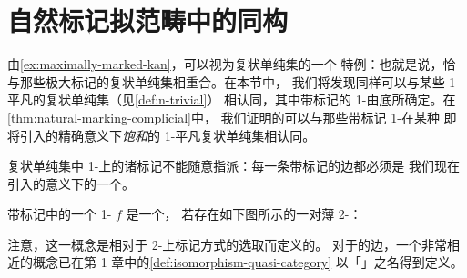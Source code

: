 
\section{自然标记拟范畴中的同构}\label{sec:isomorphisms-naturally-marked-quasi-categories}

由\cref{ex:maximally-marked-kan}，\trKanComplex{}可以视为复状单纯集的一个
特例：也就是说，\trKanComplex{}恰与那些极大标记的复状单纯集相重合。在本节中，
我们将发现\trQuasiCategory{}同样可以与某些 1-平凡的复状单纯集（见\cref{def:n-trivial}）
相认同，其中带标记的 1-\trSimplex{}由底\trSimplicialSet{}所确定。在\cref{thm:natural-marking-complicial}中，
我们证明\trQuasiCategory{}的\trCategory{}可以与那些带标记 1-\trSimplex{}在某种
即将引入的精确意义下\emph{饱和}的 1-平凡复状单纯集相认同。

复状单纯集中 1-\trSimplex{}上的诸标记不能随意指派：每一条带标记的边都必须是
我们现在引入的意义下的一个\trEquivalence。

\begin{definition}[\trEquivalence]\label{def:equivalence-marked-simplicial-set}
带标记\trSimplicialSet{}中的一个 1-\trSimplex{} $f$ 是一个\textbf{\trEquivalence}，
若存在如下图所示的一对薄 2-\trSimplex：
\begin{center}
\qquad
{}
\end{center}
\end{definition}

注意，\trEquivalence{}这一概念是相对于 2-\trSimplex{}上标记方式的选取而定义的。
对于\trQuasiCategory{}的边，一个非常相近的概念已在第 1 章中的\cref{def:isomorphism-quasi-category}
以「\trIsomorphism」之名得到定义。

